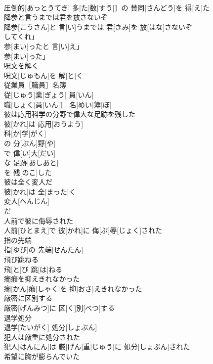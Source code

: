 \documentclass[8pt]{extreport}
\begin{document}
\begin{CJK}{UTF8}{min}
\\	圧倒的[あっとうてき] 多[た]数[すう]］の 賛同[さんどう]を 得[え]た
\\	降参と言うまでは君を放さないぞ	
\\	降参[こうさん]と 言[い]うまでは 君[きみ]を 放[はな]さないぞ
\\	[離してくれ」「参ったと言え」「参った」	
\\	離[はな]してくれ」
\\	参[まい]ったと 言[い]え」
\\	参[まい]った」
\\	呪文を解く	
\\	呪文[じゅもん]を 解[と]く
\\	従業員［職員］名簿	
\\	従[じゅう]業[ぎょう] 員[いん]
\\	職[しょく]員[いん]］ 名[めい]簿[ぼ]
\\	彼は応用科学の分野で偉大な足跡を残した	
\\	彼[かれ]は 応用[おうよう]
\\	科[か]学[がく]
\\	の 分[ぶん]野[や]
\\	で 偉[い]大[だい]
\\	な 足跡[あしあと]
\\	を 残[のこ]した 
\\	彼は全く変人だ	
\\	彼[かれ]は 全[まった]く 
\\	変人[へんじん]
\\	だ
\\	人前で彼に侮辱された	
\\	人前[ひとまえ]で 彼[かれ]に 侮[ぶ]辱[じょく]された
\\	指の先端	
\\	指[ゆび]の 先端[せんたん]
\\	飛び跳ねる	
\\	飛[と]び 跳[は]ねる
\\	癇癪を抑えきれなかった	
\\	癇[かん]癪[しゃく]を 抑[おさ]えきれなかった
\\	厳密に区別する	
\\	厳密[げんみつ]に 区[く]別[べつ]する
\\	退学処分	
\\	退学[たいがく] 処分[しょぶん]
\\	犯人は厳重に処分された	
\\	犯人[はんにん]は 厳[げん]重[じゅう]に 処分[しょぶん]された
\\	希望に胸が膨らんでいた	

\end{CJK}
\end{document}

